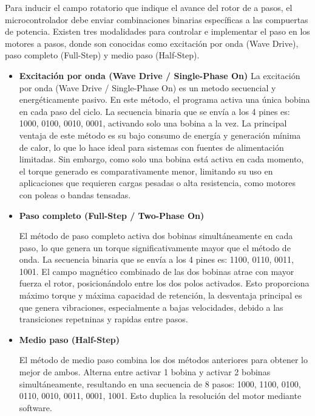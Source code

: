 \documentclass[letterpaper,12pt]{article}
\begin{document}
    Para inducir el campo rotatorio que indique el avance del rotor de a pasos,
    el microcontrolador debe enviar combinaciones binarias específicas a las compuertas de potencia. 
    Existen tres modalidades para controlar e implementar el paso en los motores a pasos, donde son conocidas como
    excitación por onda (Wave Drive), paso completo (Full-Step) y medio paso (Half-Step).

    \begin{itemize}
        \item \textbf{Excitación por onda (Wave Drive / Single-Phase On)}
            La excitación por onda (Wave Drive / Single-Phase On) es un metodo secuencial y energéticamente pasivo.
            En este método, el programa activa una única bobina en cada paso del ciclo. La secuencia binaria que se envía a los 4 pines es: 1000, 0100, 0010, 0001, activando solo una bobina a la vez. La principal ventaja de este método es su bajo consumo de energía y generación mínima de calor, lo que lo hace ideal para sistemas con fuentes de alimentación limitadas. Sin embargo, como solo una bobina está activa en cada momento, el torque generado es comparativamente menor, limitando su uso en aplicaciones que requieren cargas pesadas o alta resistencia, como motores con poleas o bandas tensadas.

        \item \textbf{Paso completo (Full-Step / Two-Phase On)}

        El método de paso completo activa dos bobinas simultáneamente en cada paso, 
        lo que genera un torque significativamente mayor que el método de onda. La secuencia binaria que 
        se envía a los 4 pines es: 1100, 0110, 0011, 1001. El campo magnético combinado de las dos bobinas 
        atrae con mayor fuerza el rotor, posicionándolo entre los dos polos activados. 
        Esto proporciona máximo torque y máxima capacidad de retención, la desventaja principal es que genera vibraciones, 
        especialmente a bajas velocidades, debido a las transiciones repetninas y rapidas entre pasos.


        \item \textbf{Medio paso (Half-Step)}

        El método de medio paso combina los dos métodos anteriores para obtener lo mejor de ambos. Alterna entre activar 1 bobina y activar 2 bobinas simultáneamente, resultando en una secuencia de 8 pasos: 1000, 1100, 0100, 0110, 0010, 0011, 0001, 1001. Esto duplica la resolución del motor mediante software.
    \end{itemize}
    
\end{document}
